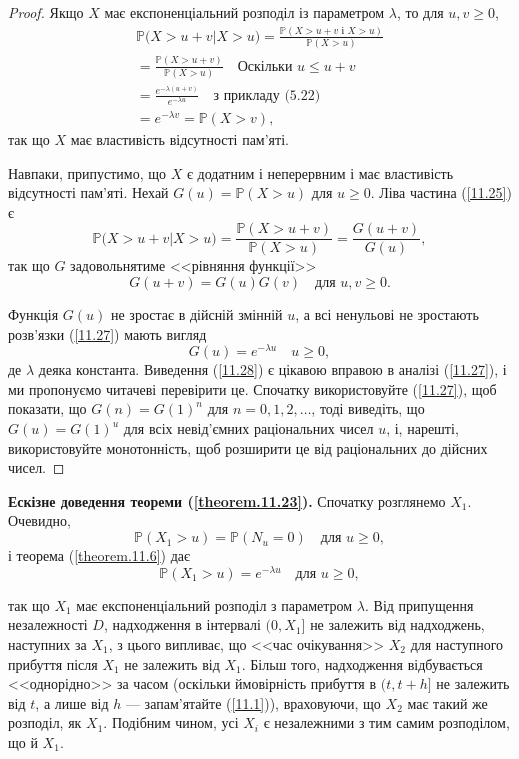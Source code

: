 \documentclass[12pt,fleqn]{article}
\numberwithin{figure}{section}
\numberwithin{equation}{section}
\begin{document}
\begin{proof}
  Якщо $X$ має експоненціальний розподіл із параметром $\lambda$, то для $u, v \geq0$,  
  \begin{eqnarray*}
    \mathbb{P}\bigg(X>u+v\bigg|X > u\bigg)= \frac{\mathbb{P}(X>u+v\text{ і }X>u)}{\mathbb{P}(X>u)} \\
    =\frac{\mathbb{P}(X>u+v)}{\mathbb{P}(X>u)} \quad \text{Оскільки } u \leq u+v \\
    =\frac{e^{-\lambda(u+v)}}{e^{-\lambda u}} \quad \text{з прикладу (5.22)} \\
    = e^{-\lambda v}=\mathbb{P}(X>v),
  \end{eqnarray*}
так що $X$ має властивість відсутності пам'яті.

Навпаки, припустимо, що $X$ є додатним і неперервним і має властивість відсутності пам'яті. Нехай $G(u)=\mathbb{P}(X>u)$ для $u\geq 0$. Ліва частина (\ref{11.25}) є
$$\mathbb{P}\bigg(X>u+v\bigg|X>u\bigg)= \frac{\mathbb{P}(X>u+v)}{\mathbb{P}(X>u)}=\frac{G(u+v)}{G(u)},$$
так що $G$ задовольнятиме <<рівняння функції>>
\begin{equation}\label{11.27}
  G(u+v)=G(u)G(v) \quad \text{для } u, v\geq0.
\end{equation}

Функція $G(u)$ не зростає в дійсній змінній $u$, а всі ненульові не зростають розв'язки (\ref{11.27}) мають вигляд
\begin{equation}\label{11.28}
  G(u)=e^{-\lambda u} \quad u \geq 0,
\end{equation}
де $\lambda$ деяка константа. Виведення (\ref{11.28}) є цікавою вправою в аналізі (\ref{11.27}), і ми пропонуємо читачеві перевірити це. Спочатку використовуйте (\ref{11.27}), щоб показати, що $G(n)=G(1)^n$ для $n=0,1,2,\dots$, тоді виведіть, що $G(u)=G(1)^u$ для всіх невід'ємних раціональних чисел $u$, і, нарешті, використовуйте монотонність, щоб розширити це від раціональних до дійсних чисел.
\end{proof}

\textbf{Ескізне доведення теореми (\ref{theorem.11.23}).} Спочатку розглянемо $X_1$. Очевидно,
$$\mathbb{P}(X_1>u)=\mathbb{P}(N_u=0) \quad \text{для } u \geq 0,$$
і теорема (\ref{theorem.11.6}) дає
$$\mathbb{P}(X_1>u)=e^{-\lambda u} \quad \text{для } u \geq 0,$$

так що $X_1$ має експоненціальний розподіл з параметром $\lambda$. Від припущення незалежності $D$, надходження в інтервалі $(0, X_1]$ не залежить від надходжень, наступних за $X_1$, з цього випливає, що <<час очікування>> $X_2$ для наступного прибуття після $X_1$ не залежить від $X_1$. Більш того, надходження відбувається <<однорідно>> за часом (оскільки ймовірність прибуття в $(t, t+h]$ не залежить від $t$, а лише від $h$ --- запам'ятайте (\ref{11.1})), враховуючи, що $X_2$ має такий же розподіл, як $X_1$. Подібним чином, усі $X_i$ є незалежними з тим самим розподілом, що й $X_1$.
\end{document}
